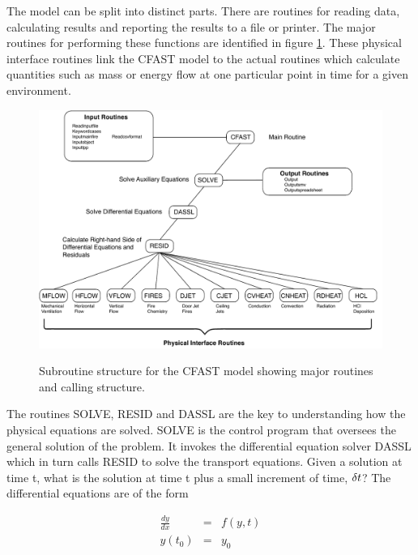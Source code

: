 The model can be split into distinct parts. There are routines for reading data, calculating results
and reporting the results to a file or printer. The major routines for performing these functions
are identified in figure \ref{figCFASTStructure}. These physical interface routines link the CFAST model to the actual routines which calculate quantities such as mass or energy flow at one particular point in time for a given environment.

\begin{figure}[\figoptions{b}]
\begin{center}
\includegraphics[width=4.4444in]{FIGURES/Structure}\\
\end{center}
\caption[Subroutine structure for the CFAST model]{Subroutine structure for the CFAST model showing major routines and calling structure.}
 \label{figCFASTStructure}
\end{figure}

The routines SOLVE, RESID and DASSL are the key to understanding how the physical
equations are solved. SOLVE is the control program that oversees the general solution of the
problem. It invokes the differential equation solver DASSL \cite{DASSL} which in turn calls RESID to
solve the transport equations. Given a solution at time t, what is the solution at time t plus a
small increment of time, $\delta t$? The differential equations are of the form

\begin{eqnarray}
   \frac{{dy}}{{dx}} &=& f(y,t) \label{eqdiffeqform}  \\
    y(t_0 ) &=& y_0 \nonumber
\end{eqnarray}

